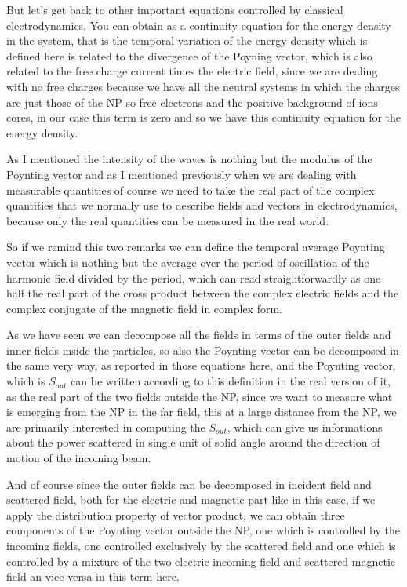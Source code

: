 \documentclass[../main/main.tex]{subfiles}
\begin{document}
But let's get back to other important equations controlled by classical electrodynamics. You can obtain as a continuity equation for the energy density in the system, that is the temporal variation of the energy density which is defined here is related to the divergence of the Poyning vector, which is also related to the free charge current times the electric field, since we are dealing with no free charges because we have all the neutral systems in which the charges are just those of the NP so free electrons and the positive background of ions cores, in our case this term is zero and so we have this continuity equation for the energy density.

As I mentioned the intensity of the waves is nothing but the modulus of the Poynting vector and as I mentioned previously when we are dealing with measurable quantities of course we need to take the real part of the complex quantities that we normally use to describe fields and vectors in electrodynamics, because only the real quantities can be measured in the real world. 

So if we remind this two remarks we can define the temporal average Poynting vector which is nothing but the average over the period of oscillation of the harmonic field divided by the period, which can read straightforwardly as one half the real part of the cross product between the complex electric fields and the complex conjugate of the magnetic field in complex form.

As we have seen we can decompose all the fields in terms of the outer fields and inner fields inside the particles, so also the Poynting vector can be decomposed in the same very way, as reported in those equations here, and the Poynting vector, which is $S_{out}$ can be written according to this definition in the real version of it, as the real part of the two fields outside the NP, since we want to measure what is emerging from the NP in the far field, this at a large distance from the NP, we are primarily interested in computing the $S_{out}$, which can give us informations about the power scattered in single unit of solid angle around the direction of motion of the incoming beam.

And of course since the outer fields can be decomposed in incident field and scattered field, both for the electric and magnetic part like in this case, if we apply the distribution property of vector product, we can obtain three components of the Poynting vector outside the NP, one which is controlled by the incoming fields, one controlled exclusively by the scattered field and one which is controlled by a mixture of the two electric incoming field and scattered magnetic field an vice versa in this term here.
\end{document}
